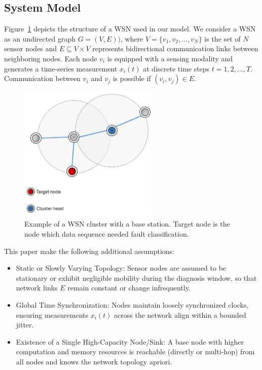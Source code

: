 \subsection{System Model}
Figure~\ref{fig:wsn} depicts the structure of a WSN used in our model. We consider a WSN as an undirected graph \(G=(V,E))\), where \(V=\{v_1, v_2, \ldots, v_N\}\) is the set of \(N\) sensor nodes and \(E \subseteq V \times V\) represents bidirectional communication links between neighboring nodes. Each node \(v_i\) is equipped with a sensing modality and generates a time-series measurement \(x_i(t)\) at discrete time steps \(t=1, 2, \ldots, T\). Communication between \(v_i\) and \(v_j\) is possible if \((v_i,v_j) \in E\). 

\begin{figure}
  \centering
  \includegraphics[width=0.6\textwidth]{images/WSN.png}
  \caption{Example of a WSN cluster with a base station. Target node is the node which data sequence needed fault classification.}
  \label{fig:wsn}
\end{figure}

This paper make the following additional assumptions:
\begin{itemize}
  \item Static or Slowly Varying Topology: Sensor nodes are assumed to be stationary or exhibit negligible mobility during the diagnosis window, so that network links \(E\) remain constant or change infrequently.
  \item Global Time Synchronization: Nodes maintain loosely synchronized clocks, ensuring measurements \(x_i(t)\) across the network align within a bounded jitter. 
  \item Existence of a Single High-Capacity Node/Sink: A base node with higher computation and memory resources is reachable (directly or multi-hop) from all nodes and knows the network topology apriori. 
\end{itemize}

